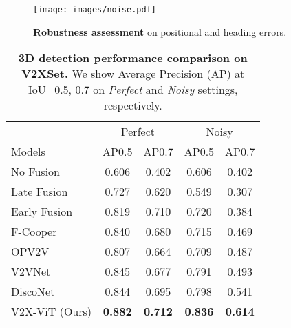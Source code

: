 \documentclass[runningheads]{llncs}
\begin{document}
\begin{figure*}[!t]
\centering
\texttt{[image: images/noise.pdf]}
\vspace{-2mm}
\caption{\textbf{Robustness assessment} on positional and heading errors.}
\label{fig:pose_error}
\vspace{-4mm}
\end{figure*}

\begin{table}[!t]
\centering
\scriptsize 
\setlength{\tabcolsep}{8pt}
\renewcommand{\arraystretch}{1.0}
\caption{\textbf{3D detection performance comparison on V2XSet.} We show Average Precision (AP) at IoU={0.5, 0.7} on \textit{Perfect} and \textit{Noisy} settings, respectively.}
\label{table:benchmark}
\begin{tabular}{lcccc}
\cellcolor{lightgray} & \multicolumn{2}{c}{\cellcolor{lightgray} Perfect}&\multicolumn{2}{c}{\cellcolor{lightgray} Noisy}\\ 
\cline{2-3}\cline{4-5}
{\cellcolor{lightgray} Models}
& \cellcolor{lightgray} AP0.5& \cellcolor{lightgray} AP0.7& \cellcolor{lightgray} AP0.5& \cellcolor{lightgray} AP0.7\\ \toprule
No Fusion           & 0.606          & 0.402          & 0.606          & 0.402          \\ 
Late Fusion          & 0.727          & 0.620          & 0.549          & 0.307          \\
Early Fusion         & 0.819          & 0.710          & 0.720          & 0.384          \\\midrule
F-Cooper~\cite{chen2019f}             & 0.840          & 0.680          & 0.715          & 0.469          \\
OPV2V~\cite{xu2021opv2v}                & 0.807          & 0.664          & 0.709          & 0.487          \\
V2VNet~\cite{wang2020v2vnet}                & 0.845          & 0.677          & 0.791        & 0.493          \\
DiscoNet~\cite{li2021learning}& 0.844 & 0.695 & 0.798& 0.541 \\ 
\midrule
V2X-ViT (Ours)          & \textbf{0.882} & \textbf{0.712} & \textbf{0.836} & \textbf{0.614} \\ 
\bottomrule
\end{tabular}
\vspace{-3mm}
\end{table}
\end{document}
